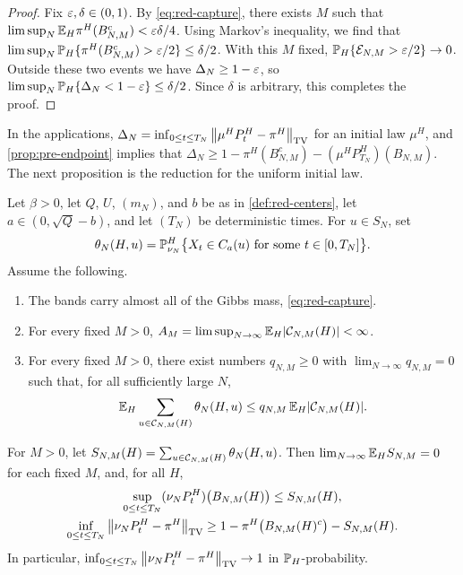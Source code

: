 \begin{proof}
Fix $\varepsilon,\delta\in(0,1)$. By \eqref{eq:red-capture}, there exists $M$ such that $\limsup_N\mathbb E_H\pi^H(B_{N,M}^c)<\varepsilon\delta/4$. Using Markov's inequality, we find that $\limsup_N\mathbb P_H\{\pi^H(B_{N,M}^c)>\varepsilon/2\}\le\delta/2$. With this $M$ fixed, $\mathbb P_H\{\mathcal E_{N,M}>\varepsilon/2\}\to0$. Outside these two events we have $\Delta_N\ge1-\varepsilon$, so $\limsup_N\mathbb P_H\{\Delta_N<1-\varepsilon\}\le\delta/2$. Since $\delta$ is arbitrary, this completes the proof.
\end{proof}

In the applications, $\Delta_N=\inf_{0\le t\le T_N}\left\lVert\mu^HP^H_t-\pi^H\right\rVert_{\mathrm{TV}}$ for an initial law $\mu^H$, and \cref{prop:pre-endpoint} implies that $\Delta_N\ge1-\pi^H(B_{N,M}^c)-(\mu^HP^H_{T_N})(B_{N,M})$. The next proposition is the reduction for the uniform initial law.

\begin{proposition}\label{prop:red-consumer}
Let $\beta>0$, let $Q$, $U$, $(m_N)$, and $b$ be as in \cref{def:red-centers}, let $a\in(0,\sqrt Q-b)$, and let $(T_N)$ be deterministic times. For $u\in S_N$, set
\begin{equation*}
\theta_N(H,u)=\mathbb P^H_{\nu_N}\bigl\{X_t\in C_a(u)\text{ for some }t\in[0,T_N]\bigr\}.
\end{equation*}
Assume the following.
\begin{enumerate}[label=(\roman*)]
\item The bands carry almost all of the Gibbs mass, \eqref{eq:red-capture}.
\item For every fixed $M>0$, $A_M=\limsup_{N\to\infty}\mathbb E_H|\mathcal C_{N,M}(H)|<\infty$.
\item For every fixed $M>0$, there exist numbers $q_{N,M}\ge0$ with $\lim_{N\to\infty}q_{N,M}=0$ such that, for all sufficiently large $N$,
\begin{equation}\label{eq:red-palm}
\mathbb E_H\sum_{u\in\mathcal C_{N,M}(H)}\theta_N(H,u)\le q_{N,M}\,\mathbb E_H|\mathcal C_{N,M}(H)|.
\end{equation}
\end{enumerate}
For $M>0$, let $S_{N,M}(H)=\sum_{u\in\mathcal C_{N,M}(H)}\theta_N(H,u)$. Then $\lim_{N\to\infty}\mathbb E_HS_{N,M}=0$ for each fixed $M$, and, for all $H$,
\begin{equation}\label{eq:red-path-bound}
\begin{gathered}
\sup_{0\le t\le T_N}(\nu_NP^H_t)\bigl(B_{N,M}(H)\bigr)\le S_{N,M}(H),\\
\inf_{0\le t\le T_N}\left\lVert\nu_NP^H_t-\pi^H\right\rVert_{\mathrm{TV}}\ge1-\pi^H\bigl(B_{N,M}(H)^c\bigr)-S_{N,M}(H).
\end{gathered}
\end{equation}
In particular, $\inf_{0\le t\le T_N}\left\lVert\nu_NP^H_t-\pi^H\right\rVert_{\mathrm{TV}}\to1$ in $\mathbb P_H$-probability.
\end{proposition}


